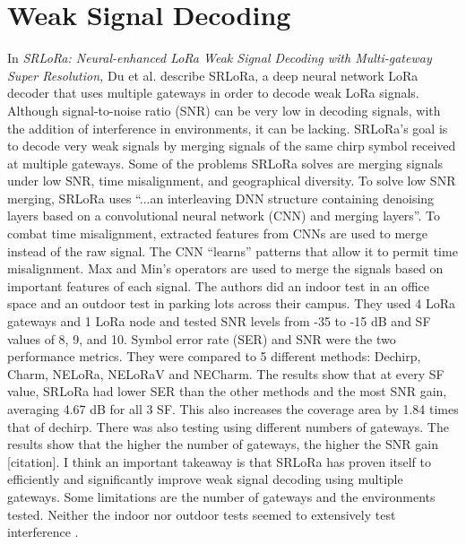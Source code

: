 \documentclass[sigsmall]{acmart}
\begin{document}
\section*{Weak Signal Decoding}
In \textit{SRLoRa: Neural-enhanced LoRa Weak Signal Decoding with Multi-gateway Super Resolution,} Du et al. describe SRLoRa, a deep neural network LoRa decoder that uses multiple gateways in order to decode weak LoRa signals. Although signal-to-noise ratio (SNR) can be very low in decoding signals, with the addition of interference in environments, it can be lacking. SRLoRa’s goal is to decode very weak signals by merging signals of the same chirp symbol received at multiple gateways. Some of the problems SRLoRa solves are merging signals under low SNR, time misalignment, and geographical diversity. To solve low SNR merging, SRLoRa uses “...an interleaving DNN structure containing denoising layers based on a convolutional neural network (CNN) and merging layers”. To combat time misalignment, extracted features from CNNs are used to merge instead of the raw signal. The CNN “learns” patterns that allow it to permit time misalignment. Max and Min's operators are used to merge the signals based on important features of each signal. The authors did an indoor test in an office space and an outdoor test in parking lots across their campus. They used 4 LoRa gateways and 1 LoRa node and tested SNR levels from -35 to -15 dB and SF values of 8, 9, and 10. Symbol error rate (SER) and SNR were the two performance metrics. They were compared to 5 different methods: Dechirp, Charm, NELoRa, NELoRaV and NECharm. The results show that at every SF value, SRLoRa had lower SER than the other methods and the most SNR gain, averaging 4.67 dB for all 3 SF. This also increases the coverage area by 1.84 times that of dechirp. There was also testing using different numbers of gateways. The results show that the higher the number of gateways, the higher the SNR gain [citation]. I think an important takeaway is that SRLoRa has proven itself to efficiently and significantly improve weak signal decoding using multiple gateways. Some limitations are the number of gateways and the environments tested. Neither the indoor nor outdoor tests seemed to extensively test interference \cite{du2023srlora}.
\end{document}
